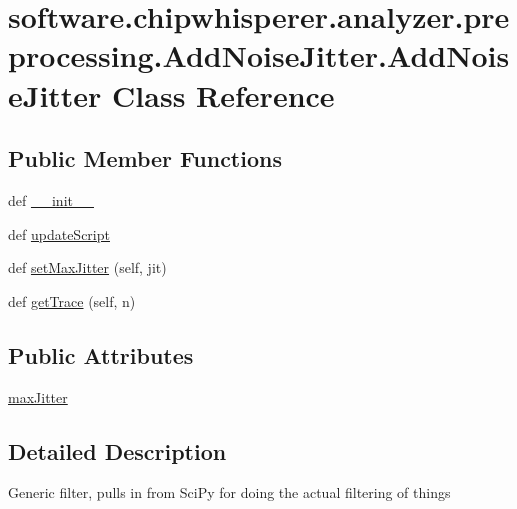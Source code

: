 \hypertarget{classsoftware_1_1chipwhisperer_1_1analyzer_1_1preprocessing_1_1AddNoiseJitter_1_1AddNoiseJitter}{}\section{software.\+chipwhisperer.\+analyzer.\+preprocessing.\+Add\+Noise\+Jitter.\+Add\+Noise\+Jitter Class Reference}
\label{classsoftware_1_1chipwhisperer_1_1analyzer_1_1preprocessing_1_1AddNoiseJitter_1_1AddNoiseJitter}
\subsection*{Public Member Functions}
\begin{DoxyCompactItemize}
\item 
def \hyperlink{classsoftware_1_1chipwhisperer_1_1analyzer_1_1preprocessing_1_1AddNoiseJitter_1_1AddNoiseJitter_a4deeabfacda9c24b44cec87d396cc915}{\+\_\+\+\_\+init\+\_\+\+\_\+}
\item 
def \hyperlink{classsoftware_1_1chipwhisperer_1_1analyzer_1_1preprocessing_1_1AddNoiseJitter_1_1AddNoiseJitter_ae58ef89e17377776d970a6a62b59b318}{update\+Script}
\item 
def \hyperlink{classsoftware_1_1chipwhisperer_1_1analyzer_1_1preprocessing_1_1AddNoiseJitter_1_1AddNoiseJitter_a69cbd41a530473cb34aabff927a35ea6}{set\+Max\+Jitter} (self, jit)
\item 
def \hyperlink{classsoftware_1_1chipwhisperer_1_1analyzer_1_1preprocessing_1_1AddNoiseJitter_1_1AddNoiseJitter_a633104366a15b1e78bde7b1bb80fcc29}{get\+Trace} (self, n)
\end{DoxyCompactItemize}
\subsection*{Public Attributes}
\begin{DoxyCompactItemize}
\item 
\hyperlink{classsoftware_1_1chipwhisperer_1_1analyzer_1_1preprocessing_1_1AddNoiseJitter_1_1AddNoiseJitter_a1ea50a845c9821cfd0331c501be94d96}{max\+Jitter}
\end{DoxyCompactItemize}


\subsection{Detailed Description}
\begin{DoxyVerb}Generic filter, pulls in from SciPy for doing the actual filtering of things
\end{DoxyVerb}
 

